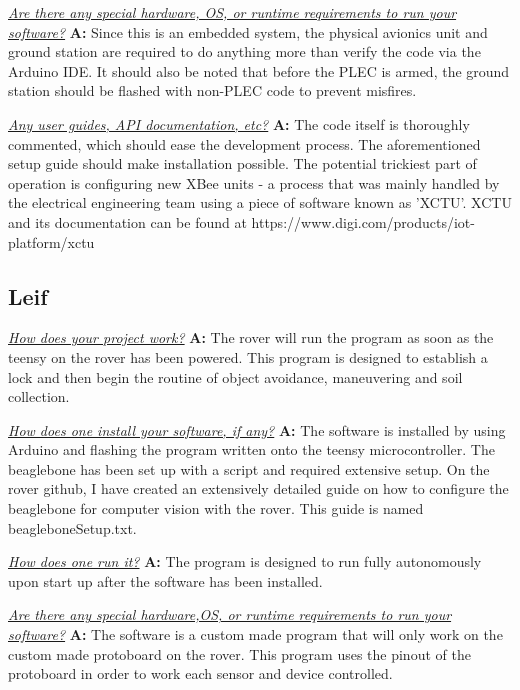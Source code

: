 \documentclass[onecolumn, draftclsnofoot, 10pt, compsoc]{IEEEtran}
\begin{document}
\textit{\underline{Are there any special hardware, OS, or runtime requirements to run your software?}}
\newline\textbf{A:} Since this is an embedded system, the physical avionics unit and ground station are required to do anything more than verify the code via the Arduino IDE. It should also be noted that before the PLEC is armed, the ground station should be flashed with non-PLEC code to prevent misfires. \newline 

\textit{\underline{Any user guides, API documentation, etc?}}
\newline\textbf{A:} The code itself is thoroughly commented, which should ease the development process. The aforementioned setup guide should make installation possible. The potential trickiest part of operation is configuring new XBee units - a process that was mainly handled by the electrical engineering team using a piece of software known as 'XCTU'. XCTU and its documentation can be found at https://www.digi.com/products/iot-platform/xctu

\subsection{Leif}
\textit{\underline{How does your project work?}}
\newline\textbf{A:} The rover will run the program as soon as the teensy on the rover has been powered. This program is designed to establish a lock and then begin the routine of object avoidance, maneuvering and soil collection. \newline

\textit{\underline{How does one install your software, if any?}}
\newline\textbf{A:} The software is installed by using Arduino and flashing the program written onto the teensy microcontroller. The beaglebone has been set up with a script and required extensive setup. On the rover github, I have created an extensively detailed guide on how to configure the beaglebone for computer vision with the rover. This guide is named beagleboneSetup.txt. \newline

\textit{\underline{How does one run it?}}
\newline\textbf{A:} The program is designed to run fully autonomously upon start up after the software has been installed.\newline 

\textit{\underline{Are there any special hardware,OS, or runtime requirements to run your software?}}
\newline\textbf{A:} The software is a custom made program that will only work on the custom made protoboard on the rover. This program uses the pinout of the protoboard in order to work each sensor and device controlled. \newline 
\end{document}
